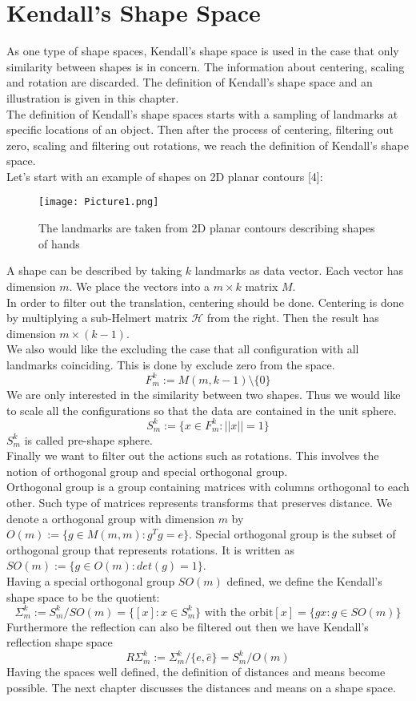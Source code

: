 \documentclass[12pt]{article}
\theoremstyle{definition}
\theoremstyle{remark}
\numberwithin{equation}{section}
\begin{document}
\section{Kendall's Shape Space}
As one type of shape spaces, Kendall's shape space is used in the case that only similarity between shapes is in concern. The information about centering, scaling and rotation are discarded. The definition of Kendall's shape space and an illustration is given in this chapter.\\[0.2cm]
\indent The definition of Kendall's shape spaces starts with a sampling of landmarks at specific locations of an object. Then after the process of centering, filtering out zero, scaling and filtering out rotations, we reach the definition of Kendall's shape space.\\[0.2cm]
\indent Let's start with an example of shapes on 2D planar contours [4]: 
\begin{figure}
\begin{center}
    \texttt{[image: Picture1.png]}
    \caption{The landmarks are taken from 2D planar contours describing shapes of hands}
\end{center}
\end{figure}
\indent A shape can be described by taking $k$ landmarks as data vector. Each vector has dimension $m$. We place the vectors into a $m\times k$ matrix $M$. \\[0.2cm]
In order to filter out the translation, centering should be done. Centering is done by multiplying a sub-Helmert matrix $\mathcal{H}$ from the right. Then the result has dimension $m \times (k-1)$. \\[0.2cm]
\indent We also would like the excluding the case that all configuration with all landmarks coinciding. This is done by exclude zero from the space.
\[F_m^k := M(m, k-1) \setminus \{0\}\]
\indent We are only interested in the similarity between two shapes. Thus we would like to scale all the configurations so that the data are contained in the unit sphere.
\[S_m^k := \{x\in F_m^k: ||x|| = 1\}\]
\indent $S_m^k$ is called pre-shape sphere.\\[0.2cm]
\indent Finally we want to filter out the actions such as rotations. This involves the notion of orthogonal group and special orthogonal group.\\[0.2cm]
\indent Orthogonal group is a group containing matrices with columns orthogonal to each other. Such type of matrices represents transforms that preserves distance. We denote a orthogonal group with dimension $m$ by $O(m) := \{g \in M(m,m): g^Tg = e\}.$ Special orthogonal group is the subset of orthogonal group that represents rotations. It is written as $SO(m) := \{g \in O(m): det(g) = 1\}$.\\[0.2cm]
\indent Having a special orthogonal group $SO(m)$ defined, we define the Kendall's shape space to be the quotient:
\[\Sigma_m^k := S_m^k / SO(m) = \{[x]:x\in S_m^k\} \text{ with the orbit} [x] = \{gx : g \in SO(m)\}\]
\indent Furthermore the reflection can also be filtered out then we have Kendall's reflection shape space
\[R\Sigma_m^k := \Sigma_m^k / \{e,\hat{e}\} = S_m^k / O(m)\]
\indent Having the spaces well defined, the definition of distances and means become possible. The next chapter discusses the distances and means on a shape space.
\end{document}
